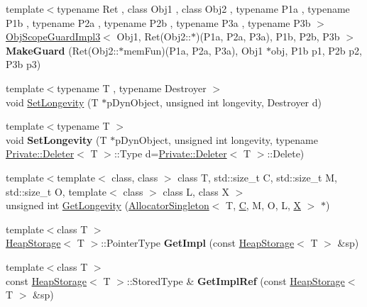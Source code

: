 \begin{DoxyCompactItemize}
\item 
\hypertarget{namespaceLoki_a1db31abea77ece2683651458b98f9739}{}{\footnotesize template$<$typename Ret , class Obj1 , class Obj2 , typename P1a , typename P1b , typename P2a , typename P2b , typename P3a , typename P3b $>$ }\\\hyperlink{classLoki_1_1ObjScopeGuardImpl3}{Obj\+Scope\+Guard\+Impl3}$<$ Obj1, Ret(Obj2\+::$\ast$)(P1a, P2a, P3a), P1b, P2b, P3b $>$ {\bfseries Make\+Guard} (Ret(Obj2\+::$\ast$mem\+Fun)(P1a, P2a, P3a), Obj1 $\ast$obj, P1b p1, P2b p2, P3b p3)\label{namespaceLoki_a1db31abea77ece2683651458b98f9739}

\item 
{\footnotesize template$<$typename T , typename Destroyer $>$ }\\void \hyperlink{group__LifetimeGroup_ga3d62eacf2db507af877988f5a2ed34d7}{Set\+Longevity} (T $\ast$p\+Dyn\+Object, unsigned int longevity, Destroyer d)
\item 
\hypertarget{namespaceLoki_a230f98f79c8192933bb9dfc28d7da565}{}{\footnotesize template$<$typename T $>$ }\\void {\bfseries Set\+Longevity} (T $\ast$p\+Dyn\+Object, unsigned int longevity, typename \hyperlink{structLoki_1_1Private_1_1Deleter}{Private\+::\+Deleter}$<$ T $>$\+::Type d=\hyperlink{structLoki_1_1Private_1_1Deleter}{Private\+::\+Deleter}$<$ T $>$\+::Delete)\label{namespaceLoki_a230f98f79c8192933bb9dfc28d7da565}

\item 
{\footnotesize template$<$template$<$ class, class $>$ class T, std\+::size\+\_\+t C, std\+::size\+\_\+t M, std\+::size\+\_\+t O, template$<$ class $>$ class L, class X $>$ }\\unsigned int \hyperlink{namespaceLoki_a11f97d238fc97e561bcfa9fa633560e0}{Get\+Longevity} (\hyperlink{classLoki_1_1AllocatorSingleton}{Allocator\+Singleton}$<$ T, \hyperlink{classC}{C}, M, O, L, \hyperlink{structX}{X} $>$ $\ast$)
\item 
\hypertarget{namespaceLoki_a5e28ff76350214c2575004b34a034856}{}{\footnotesize template$<$class T $>$ }\\\hyperlink{classLoki_1_1HeapStorage}{Heap\+Storage}$<$ T $>$\+::Pointer\+Type {\bfseries Get\+Impl} (const \hyperlink{classLoki_1_1HeapStorage}{Heap\+Storage}$<$ T $>$ \&sp)\label{namespaceLoki_a5e28ff76350214c2575004b34a034856}

\item 
\hypertarget{namespaceLoki_ad648c03517caf66c9a282397f710b22f}{}{\footnotesize template$<$class T $>$ }\\const \hyperlink{classLoki_1_1HeapStorage}{Heap\+Storage}$<$ T $>$\+::Stored\+Type \& {\bfseries Get\+Impl\+Ref} (const \hyperlink{classLoki_1_1HeapStorage}{Heap\+Storage}$<$ T $>$ \&sp)\label{namespaceLoki_ad648c03517caf66c9a282397f710b22f}


\end{DoxyCompactItemize}
